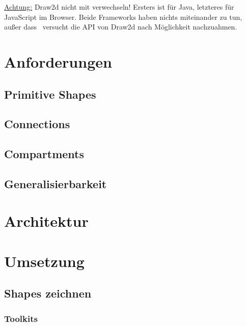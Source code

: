\underline{Achtung:}
Draw2d nicht mit \emph{\dd} verwechseln! Ersters ist für Java,
letzteres für JavaScript im Browser. Beide Frameworks haben nichts miteinander
zu tun, außer dass \dd~versucht die API von Draw2d nach Möglichkeit
nachzuahmen.


\section{Anforderungen}

\subsection{Primitive Shapes}

\subsection{Connections}

\subsection{Compartments}

\subsection{Generalisierbarkeit}


\section{Architektur}


\section{Umsetzung}


\subsection{Shapes zeichnen}

\subsubsection{Toolkits}

\subsubsection{\dd}

\citep{dd}


